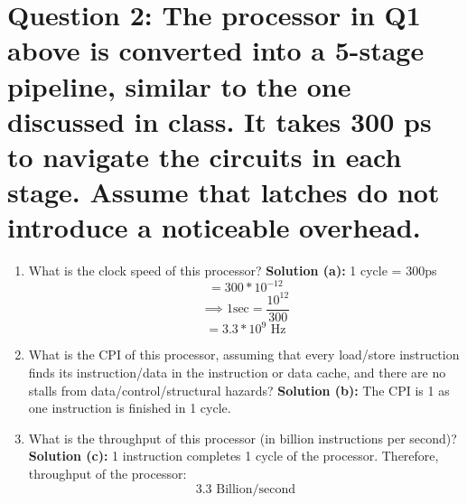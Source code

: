 \documentclass[11pt]{article}
\newenvironment{qparts}{\begin{enumerate}[{(}a{)}]}{\end{enumerate}}
\begin{document}
\section*{Question 2: The processor in Q1 above is converted into a 5-stage pipeline, similar to the one discussed in class. It takes 300 ps to navigate the circuits in each stage. Assume that latches do not introduce a noticeable overhead.}
\begin{qparts}
\item What is the clock speed of this processor? 
\newline
\textbf{Solution (a): } 1 cycle = 300ps\\
\[= 300 * 10^{-12}\]
\[\implies 1\text{sec} = \frac{10^{12}}{300}\]
\[= 3.3 * 10^{9} \text{ Hz}\]

\item What is the CPI of this processor, assuming that every load/store instruction finds its instruction/data in the instruction or data cache, and there are no stalls from data/control/structural hazards? 
\newline
\textbf{Solution (b): } The CPI is 1 as one instruction is finished in 1 cycle.

\item What is the throughput of this processor (in billion instructions per second)?
\newline 
\textbf{Solution (c): } 1 instruction completes 1 cycle of the processor. Therefore, throughput of the processor: \\
\[3.3 \text{ Billion/second}\]
\end{qparts}
\end{document}

